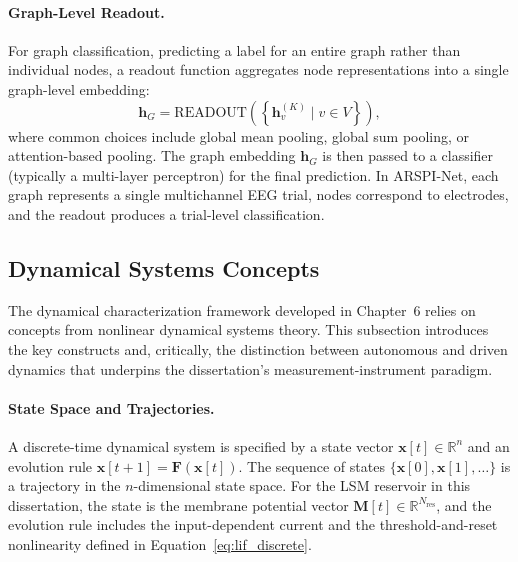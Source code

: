 \paragraph{Graph-Level Readout.}
For graph classification, predicting a label for an entire graph rather than individual nodes, a readout function aggregates node representations into a single graph-level embedding:
\begin{equation}
    \mathbf{h}_G = \text{READOUT}\!\left(\left\{\mathbf{h}_v^{(K)} \mid v \in V\right\}\right),
    \label{eq:readout}
\end{equation}
where common choices include global mean pooling, global sum pooling, or attention-based pooling. The graph embedding $\mathbf{h}_G$ is then passed to a classifier (typically a multi-layer perceptron) for the final prediction. In ARSPI-Net, each graph represents a single multichannel EEG trial, nodes correspond to electrodes, and the readout produces a trial-level classification.

\subsection{Dynamical Systems Concepts}
\label{sec:dynamical_systems}

The dynamical characterization framework developed in Chapter~6 relies on concepts from nonlinear dynamical systems theory. This subsection introduces the key constructs and, critically, the distinction between autonomous and driven dynamics that underpins the dissertation's measurement-instrument paradigm.

\paragraph{State Space and Trajectories.}
A discrete-time dynamical system is specified by a state vector $\mathbf{x}[t] \in \mathbb{R}^n$ and an evolution rule $\mathbf{x}[t+1] = \mathbf{F}(\mathbf{x}[t])$. The sequence of states $\{\mathbf{x}[0], \mathbf{x}[1], \ldots\}$ is a trajectory in the $n$-dimensional state space. For the LSM reservoir in this dissertation, the state is the membrane potential vector $\mathbf{M}[t] \in \mathbb{R}^{N_{\text{res}}}$, and the evolution rule includes the input-dependent current and the threshold-and-reset nonlinearity defined in Equation~\eqref{eq:lif_discrete}.

